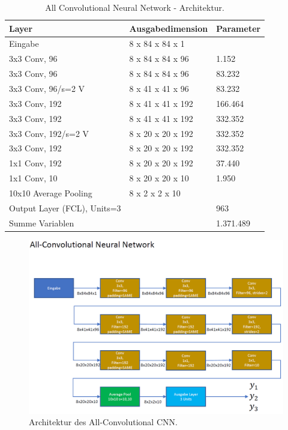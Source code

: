\begin{table}
\centering
\caption{All Convolutional Neural Network - Architektur.}
\begin{tabular}{@{}lll@{}}
\hline
Layer & Ausgabedimension & Parameter\\
\hline
Eingabe & 8 x 84 x 84 x 1 & \\
3x3 Conv, 96 & 8 x 84 x 84 x 96 & 1.152\\
3x3 Conv, 96 & 8 x 84 x 84 x 96 & 83.232\\ 
3x3 Conv, 96/s=2 V & 8 x 41 x 41 x 96 & 83.232\\ 
3x3 Conv, 192 & 8 x 41 x 41 x 192 & 166.464\\
3x3 Conv, 192 & 8 x 41 x 41 x 192 & 332.352\\
3x3 Conv, 192/s=2 V & 8 x 20 x 20 x 192 & 332.352\\
3x3 Conv, 192 & 8 x 20 x 20 x 192 & 332.352\\
1x1 Conv, 192 & 8 x 20 x 20 x 192 & 37.440\\
1x1 Conv, 10 & 8 x 20 x 20 x 10 & 1.950\\
10x10 Average Pooling & 8 x 2 x 2 x 10 & \\
Output Layer (FCL), Units=3 & & 963\\
\hline
Summe Variablen & & 1.371.489\\
\hline
\end{tabular}
\label{tb:arch_allcnn}
\end{table}
\newpage
\begin{figure}[H]
\thispagestyle{empty}
\centering
\includegraphics[angle=90, scale=0.5]{pictures/inception/AllConvCNN}
\caption{Architektur des All-Convolutional CNN.}
\label{fig:arch_allcnn}
\end{figure}

